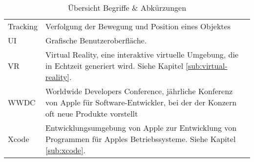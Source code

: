 \begin{table}[htb!]
\begin{tabular}{@{} p{} p{} @{}}
		Tracking & Verfolgung der Bewegung und Position eines Objektes \\
		UI & Grafische Benutzeroberfläche. \\
		VR		& Virtual Reality, eine interaktive virtuelle Umgebung, die in Echtzeit generiert wird. Siehe Kapitel \ref{sub:virtual-reality}. \\
		WWDC	& Worldwide Developers Conference, jährliche Konferenz von Apple für Software-Entwickler, bei der der Konzern oft neue Produkte vorstellt \\
		Xcode	& Entwicklungsumgebung von Apple zur Entwicklung von Programmen für Apples Betriebssysteme. Siehe Kapitel \ref{sub:xcode}. \\
		\hline
	\end{tabular}
	\caption{Übersicht Begriffe \& Abkürzungen}
\end{table}
